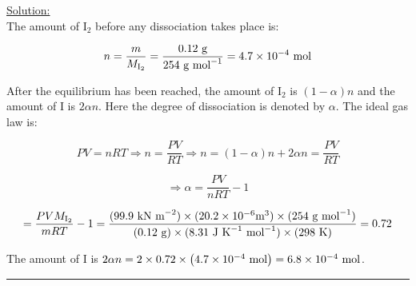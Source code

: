 \noindent
\underline{Solution:}\\


The amount of I$_2$ before any dissociation takes place is:

$$n = \frac{m}{M_{\textnormal{I}_2}} = \frac{0.12\textnormal{ g}}{254\textnormal{ g mol}^{-1}} = 4.7\times 10^{-4}\textnormal{ mol}$$

After the equilibrium has been reached, the amount of I$_2$ is $(1 - \alpha)n$ and the amount of I is $2\alpha n$. Here the degree of dissociation is denoted by $\alpha$. The ideal gas law is:

$$PV = nRT \Rightarrow n = \frac{PV}{RT} \Rightarrow n = (1 - \alpha)n + 2\alpha n = \frac{PV}{RT}$$

$$\Rightarrow \alpha = \frac{PV}{nRT} - 1$$

$$ = \frac{PVM_{\textnormal{I}_2}}{mRT} - 1 = \frac{(99.9\textnormal{ kN m}^{-2})\times(20.2\times 10^{-6}\textnormal{m}^3)\times(254\textnormal{ g mol}^{-1})}{(0.12\textnormal{ g})\times(8.31\textnormal{ J K}^{-1}\textnormal{ mol}^{-1})\times(298\textnormal{ K})} = 0.72$$

The amount of I is $2\alpha n = 2\times 0.72\times\left(4.7\times 10^{-4}\textnormal{ mol}\right) = 6.8\times 10^{-4}\textnormal{ mol}$.
\hrule\vspace{0.5cm}
